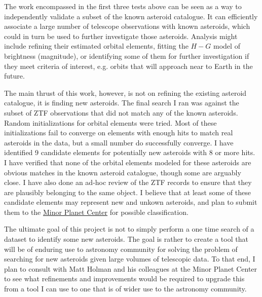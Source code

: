 The work encompassed in the first three tests above can be seen as a way to independently validate a subset of the known asteroid catalogue.
It can efficiently associate a large number of telescope observations with known asteroids,
which could in turn be used to further investigate those asteroids.
Analysis might include refining their estimated orbital elements, 
fitting the $H-G$ model of brightness (magnitude), or identifying some of them for further investigation if they meet criteria of interest,
e.g. orbits that will approach near to Earth in the future.

The main thrust of this work, however, is not on refining the existing asteroid catalogue, it is finding new asteroids.
The final search I ran was against the subset of ZTF observations that did not match any of the known asteroids.
Random initializations for orbital elements were tried.
Most of these initializations fail to converge on elements with enough hits to match real asteroids in the data,
but a small number do successfully converge.
I have identified 9 candidate elements for potentially new asteroids with 8 or more hits.
I have verified that none of the orbital elements modeled for these asteroids 
are obvious matches in the known asteroid catalogue, though some are arguably close.
I have also done an ad-hoc review of the ZTF records to ensure that they are plausibly belonging to the same object.
I believe that at least some of these candidate elements may represent new and unkown asteroids, and plan to submit them to the 
\href{https://www.minorplanetcenter.net/iau/mpc.html}{Minor Planet Center} for possible classification.

The ultimate goal of this project is not to simply perform a one time search of a dataset to identify some new asteroids.
The goal is rather to create a tool that will be of enduring use to astronomy community for solving the problem of 
searching for new asteroids given large volumes of telescopic data.
To that end, I plan to consult with Matt Holman and his colleagues at the Minor Planet Center to see what refinements and improvements
would be required to upgrade this from a tool I can use to one that is of wider use to the astronomy community.

